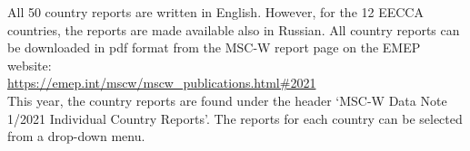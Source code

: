 All 50 country reports are written in English. However, for the 12 EECCA countries, the reports are made available also in Russian. All country reports can be downloaded in pdf format from the MSC-W report page on the EMEP website:\\

\url{https://emep.int/mscw/mscw_publications.html#2021}\\

This year, the country reports are found under the header `MSC-W Data Note 1/2021 Individual Country Reports'. The reports for each country can be selected from a drop-down menu.


\renewcommand\bibname{References}      %
